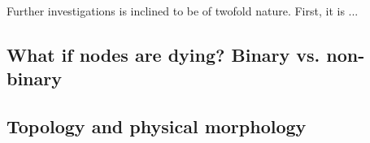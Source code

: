 Further investigations is inclined to be of twofold nature. First, it is ...

\subsection{What if nodes are dying? Binary vs. non-binary}

\subsection{Topology and physical morphology}

